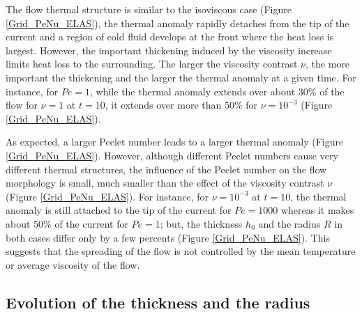The flow thermal  structure is similar to the  isoviscous case (Figure
\ref{Grid_PeNu_ELAS}), the  thermal anomaly rapidly detaches  from the
tip of the  current and a region  of cold fluid develops  at the front
where  the heat  loss is  largest. However,  the important  thickening
induced by the viscosity increase limits heat loss to the surrounding.
The  larger  the viscosity  contrast  $\nu$,  the more  important  the
thickening and  the larger the thermal  anomaly at a given  time.  For
instance, for  $Pe=1$, while  the thermal  anomaly extends  over about
$30\%$ of  the flow for $\nu=1$  at $t=10$, it extends  over more than
$50\%$ for $\nu=10^{-3}$ (Figure \ref{Grid_PeNu_ELAS}).

As expected, a larger Peclet number  leads to a larger thermal anomaly
(Figure  \ref{Grid_PeNu_ELAS}).   However, although  different  Peclet
numbers cause very  different thermal structures, the  influence of the
Peclet number on  the flow morphology is small, much  smaller than the
effect of the viscosity contrast $\nu$ (Figure \ref{Grid_PeNu_ELAS}).  For instance, for
$\nu=10^{-3}$ at $t=10$, the thermal  anomaly is still attached to the
tip of the current for $Pe = 1000$ whereas it makes about $50\%$ of the
current for $Pe=1$; but, the thickness $h_0$ and the
radius $R$ in both cases differ only by a few percents (Figure
\ref{Grid_PeNu_ELAS}). This suggests that the
spreading of  the flow is  not controlled  by the mean  temperature or
average viscosity of the flow. 
  
\subsection{Evolution of the thickness and the radius}
\label{sec:evol-thickn-radi-e}

